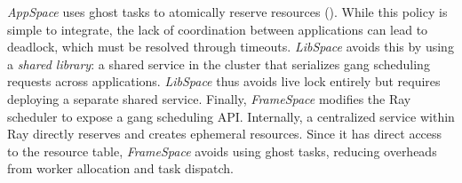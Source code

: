 \textit{AppSpace} uses ghost tasks to atomically reserve resources ().
While this policy is simple to integrate, the lack of coordination between applications can lead to deadlock, which must be resolved through timeouts. %
\textit{LibSpace} avoids this by using a \emph{shared library}: a shared service in the cluster that serializes gang scheduling requests across applications.
\textit{LibSpace} thus avoids live lock entirely but requires deploying a separate shared service.
Finally, \textit{FrameSpace} modifies the Ray scheduler to expose a gang scheduling API.
Internally, a centralized service within Ray directly reserves and creates ephemeral resources.
Since it has direct access to the resource table, \textit{FrameSpace} avoids using ghost tasks, reducing overheads from worker allocation and task dispatch.


